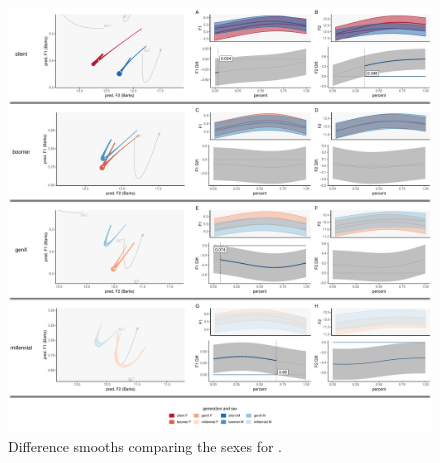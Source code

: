 \begin{figure}[p]
    \centering
    \includegraphics[width=\textwidth]{Figures/BEN/BEN_sex_panel_plot.pdf}
    \caption{Difference smooths comparing the sexes for \ben.}
    \label{fig:ben_diff_smooths_sex_gen}
\end{figure}



